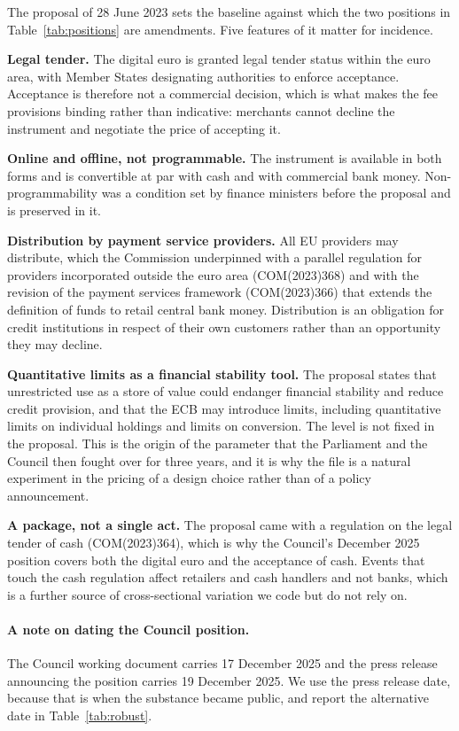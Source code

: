 \documentclass[11pt]{article}
\theoremstyle{plain}\newtheorem{proposition}{Proposition}
\begin{document}
The proposal of 28 June 2023 sets the baseline against which the two positions in Table~\ref{tab:positions} are amendments. Five features of it matter for incidence.

\textbf{Legal tender.} The digital euro is granted legal tender status within the euro area, with Member States designating authorities to enforce acceptance. Acceptance is therefore not a commercial decision, which is what makes the fee provisions binding rather than indicative: merchants cannot decline the instrument and negotiate the price of accepting it.

\textbf{Online and offline, not programmable.} The instrument is available in both forms and is convertible at par with cash and with commercial bank money. Non-programmability was a condition set by finance ministers before the proposal and is preserved in it.

\textbf{Distribution by payment service providers.} All EU providers may distribute, which the Commission underpinned with a parallel regulation for providers incorporated outside the euro area (COM(2023)368) and with the revision of the payment services framework (COM(2023)366) that extends the definition of funds to retail central bank money. Distribution is an obligation for credit institutions in respect of their own customers rather than an opportunity they may decline.

\textbf{Quantitative limits as a financial stability tool.} The proposal states that unrestricted use as a store of value could endanger financial stability and reduce credit provision, and that the ECB may introduce limits, including quantitative limits on individual holdings and limits on conversion. The level is not fixed in the proposal. This is the origin of the parameter that the Parliament and the Council then fought over for three years, and it is why the file is a natural experiment in the pricing of a design choice rather than of a policy announcement.

\textbf{A package, not a single act.} The proposal came with a regulation on the legal tender of cash (COM(2023)364), which is why the Council's December 2025 position covers both the digital euro and the acceptance of cash. Events that touch the cash regulation affect retailers and cash handlers and not banks, which is a further source of cross-sectional variation we code but do not rely on.

\paragraph{A note on dating the Council position.} The Council working document carries 17 December 2025 and the press release announcing the position carries 19 December 2025. We use the press release date, because that is when the substance became public, and report the alternative date in Table~\ref{tab:robust}.
\end{document}
